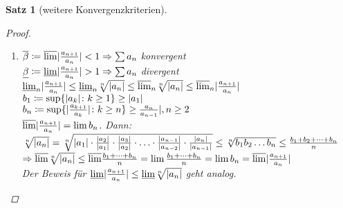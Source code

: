 \documentclass[ngerman,titlepage,twoside, parskip=half*]{scrreprt}
\theoremstyle{break}
\newtheorem{theorem}{Satz}[section]
\theoremstyle{nonumberbreak}
\newtheorem{proof}{Beweis:}
\DeclarePairedDelimiter{\abs}{\lvert}{\rvert}
\begin{document}
\begin{theorem}[weitere Konvergenzkriterien]
\begin{proof}
\begin{enumerate}[(1)]
  \item $\overline{\beta}\coloneqq\overline{\lim}\abs{\frac{a_{n+1}}{a_n}}<1 \Rightarrow \sum a_n$ konvergent\\
    $\underline{\beta}\coloneqq\underline{\lim}\abs{\frac{a_{n+1}}{a_n}}>1 \Rightarrow \sum a_n$ divergent\\
    $\underline{\lim}_n\abs{\frac{a_{n+1}}{a_n}}\leq \underline{\lim}_n \sqrt[n]{\abs{a_n}}\leq \overline{\lim}_n \sqrt[n]{\abs{a_n}}
    \leq \overline{\lim}_n \abs{\frac{a_{n+1}}{a_n}}$\\
    $b_1\coloneqq\sup \{\abs{a_k}\colon k\geq 1\}\geq \abs{a_1}$\\
    $b_n\coloneqq\sup \{\abs{\frac{a_{k+1}}{a_k}}\colon k\geq n\}\geq \frac{a_n}{a_{n-1}}|, n\geq 2$\\
    $\overline{\lim}\abs{\frac{a_{n+1}}{a_n}}=\lim b_n$. Dann:\\
    $\sqrt[n]{\abs{a_n}}=\sqrt[n]{\abs{a_1}\cdot \frac{\abs{a_2}}{\abs{a_1}}\cdot \frac{\abs{a_3}}{\abs{a_2}}\cdot \ldots \cdot 
    \frac{\abs{a_{n-1}}}{\abs{a_{n-2}}}\cdot \frac{\abs{a_n}}{\abs{a_{n-1}}}} \leq \sqrt[n]{b_1b_2\ldots b_n}\leq 
    \frac{b_1+b_2+\cdots +b_n}{n}$\\
    $\Rightarrow \overline{\lim} \sqrt[n]{\abs{a_n}}\leq \overline{\lim}
    \frac{b_1+\cdots +b_n}{n}=\lim \frac{b_1+\cdots +b_n}{n}=\lim b_n=\overline{\lim} \abs{\frac{a_{n+1}}{a_n}}$\\
    Der Beweis für $\underline{\lim}\abs{\frac{a_{n+1}}{a_n}}\leq \underline{\lim} \sqrt[n]{\abs{a_n}}$ geht analog.
\end{enumerate}
  \end{proof}
\end{theorem}
\end{document}
